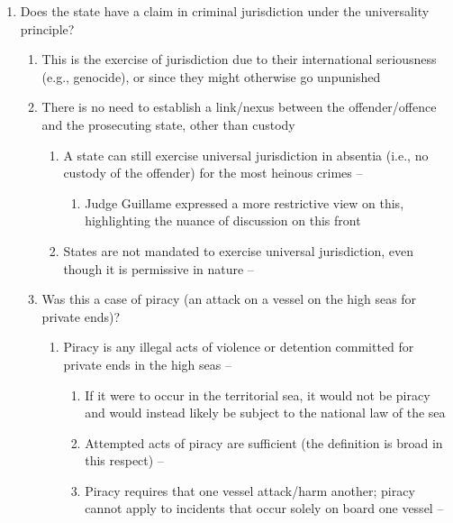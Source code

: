 \begin{enumerate}
    \item Does the state have a claim in criminal jurisdiction under the universality principle?
    \begin{enumerate}
        \item This is the exercise of jurisdiction due to their international seriousness (e.g., genocide), or since they might otherwise go unpunished
        \item There is no need to establish a link/nexus between the offender/offence and the prosecuting state, other than custody
        \begin{enumerate}
            \item A state can still exercise universal jurisdiction in absentia (i.e., no custody of the offender) for the most heinous crimes -- 
            \begin{enumerate}
                \item Judge Guillame expressed a more restrictive view on this, highlighting the nuance of discussion on this front
            \end{enumerate}
            \item States are not mandated to exercise universal jurisdiction, even though it is permissive in nature -- 
        \end{enumerate}
        \item Was this a case of piracy (an attack on a vessel on the high seas for private ends)?
        \begin{enumerate}
            \item Piracy is any illegal acts of violence or detention committed for private ends in the high seas -- 
            \begin{enumerate}
                \item If it were to occur in the territorial sea, it would not be piracy and would instead likely be subject to the national law of the sea
                \item Attempted acts of piracy are sufficient (the  definition is broad in this respect) -- 
                \item Piracy requires that one vessel attack/harm another; piracy cannot apply to incidents that occur solely on board one vessel -- 

\end{enumerate}
\end{enumerate}
\end{enumerate}
\end{enumerate}
